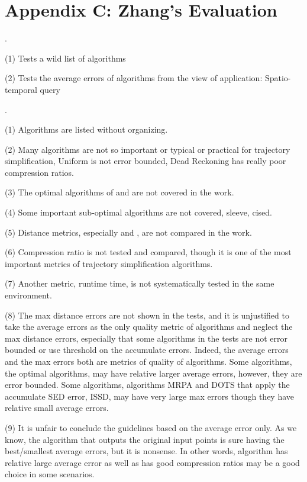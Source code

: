 \vspace{-1ex}
\section*{Appendix C: Zhang's Evaluation}

.

(1) Tests a wild list of algorithms

(2) Tests the average errors of algorithms from the view of application: Spatio-temporal query

.

(1) Algorithms are listed without organizing.

(2) Many algorithms are not so important or typical or practical for trajectory simplification, \eg Uniform is not error bounded, Dead Reckoning has really poor compression ratios.

(3) The optimal algorithms of \ped and \sed are not covered in the work.

(4) Some important sub-optimal algorithms are not covered, \eg sleeve, cised.

(5) Distance metrics, especially \ped and \sed, are not compared in the work.

(6) Compression ratio is not tested and compared, though it is one of the most important metrics of trajectory simplification algorithms.

(7) Another metric, runtime time, is not systematically tested in the same environment.

(8) The max distance errors are not shown in the tests, and it is unjustified to take the average errors as the only quality metric of algorithms and neglect the max distance errors, especially that some algorithms in the tests are not error bounded or use threshold on the accumulate errors.
Indeed, the average errors and the max errors both are metrics of quality of algorithms. Some algorithms, \eg the optimal algorithms, may have relative larger average errors, however, they are error bounded. Some algorithms, \eg algorithms MRPA and DOTS that apply the accumulate SED error, ISSD, may have very large max errors though they have relative small average errors.

(9) It is unfair to conclude the guidelines based on the average error only. As we know, the algorithm that outputs the original input points is sure having the best/smallest average errors, but it is nonsense. In other words, algorithm has relative large average error as well as has good compression ratios may be a good choice in some scenarios.
